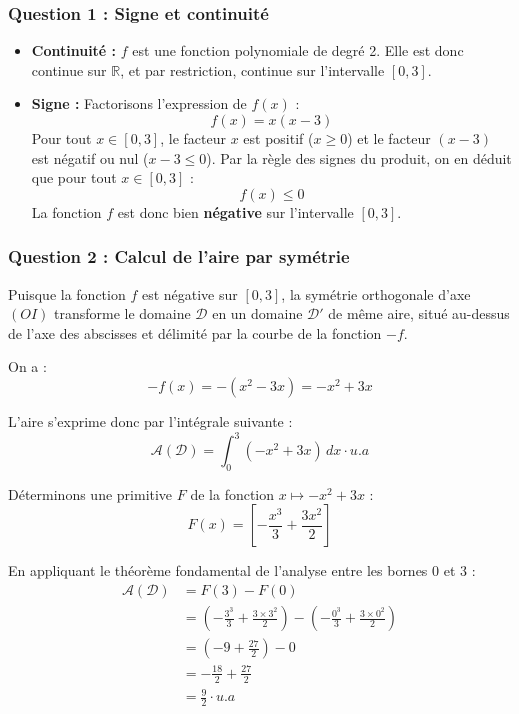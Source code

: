 \documentclass[12pt,a4paper]{article}
\begin{document}
\begin{itemize}
\subsubsection*{Question 1 : Signe et continuité}
\begin{itemize}
    \item \textbf{Continuité :} $f$ est une fonction polynomiale de degré 2. Elle est donc continue sur $\mathbb{R}$, et par restriction, continue sur l'intervalle $[0, 3]$.
    \item \textbf{Signe :} Factorisons l'expression de $f(x)$ : 
    \[ f(x) = x(x - 3) \]
    Pour tout $x \in [0, 3]$, le facteur $x$ est positif ($x \ge 0$) et le facteur $(x - 3)$ est négatif ou nul ($x - 3 \le 0$). Par la règle des signes du produit, on en déduit que pour tout $x \in [0, 3]$ :
    \[ f(x) \le 0 \]
    La fonction $f$ est donc bien \textbf{négative} sur l'intervalle $[0, 3]$.
\end{itemize}

\subsubsection*{Question 2 : Calcul de l'aire par symétrie}
Puisque la fonction $f$ est négative sur $[0,3]$, la symétrie orthogonale d'axe $(OI)$ transforme le domaine $\mathcal{D}$ en un domaine $\mathcal{D}'$ de même aire, situé au-dessus de l'axe des abscisses et délimité par la courbe de la fonction $-f$. 

On a : 
\[ -f(x) = -(x^2 - 3x) = -x^2 + 3x \]

L'aire s'exprime donc par l'intégrale suivante :
\[ \mathcal{A}(\mathcal{D}) = \int_{0}^{3} (-x^2 + 3x) \, dx \cdot u.a \]

Déterminons une primitive $F$ de la fonction $x \mapsto -x^2 + 3x$ :
\[ F(x) = \left[ -\frac{x^3}{3} + \frac{3x^2}{2} \right] \]

En appliquant le théorème fondamental de l'analyse entre les bornes $0$ et $3$ :
\begin{align*}
\mathcal{A}(\mathcal{D}) &= F(3) - F(0) \\
&= \left( -\frac{3^3}{3} + \frac{3 \times 3^2}{2} \right) - \left( -\frac{0^3}{3} + \frac{3 \times 0^2}{2} \right) \\
&= \left( -9 + \frac{27}{2} \right) - 0 \\
&= -\frac{18}{2} + \frac{27}{2} \\
&= \frac{9}{2} \cdot u.a
\end{align*}


\end{itemize}
\end{document}

